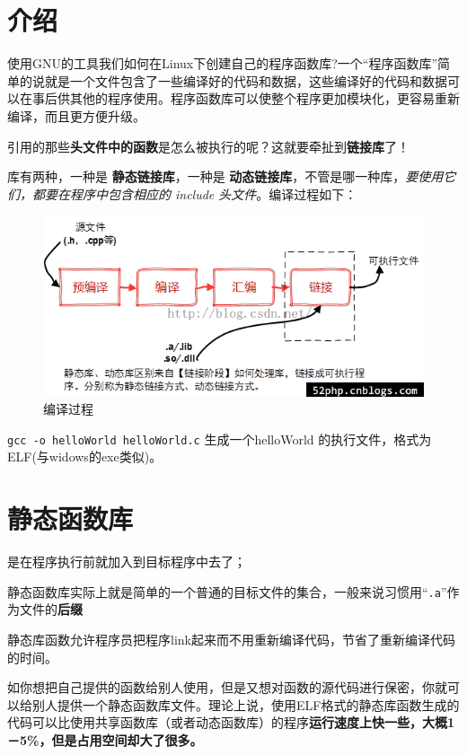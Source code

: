 \documentclass[UTF8,a4paper,12pt]{ctexbook}
\begin{document}
	\section{介绍}
		使用GNU的工具我们如何在Linux下创建自己的程序函数库?一个“程序函数库”简单的说就是一个文件包含了一些编译好的代码和数据，这些编译好的代码和数据可以在事后供其他的程序使用。程序函数库可以使整个程序更加模块化，更容易重新编译，而且更方便升级。  
		
		引用的那些\textbf{头文件中的函数}是怎么被执行的呢？这就要牵扯到\textbf{链接库}了！
		
		库有两种，一种是 \textbf{静态链接库}，一种是 \textbf{动态链接库}，不管是哪一种库，\textit{要使用它们，都要在程序中包含相应的 include 头文件}。编译过程如下：
		
		\begin{figure}[H]
			\centering
			\includegraphics[scale = 0.7]{figure/compileProcess.png}
			\caption{编译过程}
		\end{figure}
		
		\verb|gcc -o helloWorld helloWorld.c| 生成一个helloWorld 的执行文件，格式为ELF(与widows的exe类似)。
		
	\section{静态函数库}是在程序执行前就加入到目标程序中去了；
	
		静态函数库实际上就是简单的一个普通的目标文件的集合，一般来说习惯用“\verb|.a|”作为文件的\textbf{后缀}
		
		静态库函数允许程序员把程序link起来而不用重新编译代码，节省了重新编译代码的时间。
		
		如你想把自己提供的函数给别人使用，但是又想对函数的源代码进行保密，你就可以给别人提供一个静态函数库文件。理论上说，使用ELF格式的静态库函数生成的代码可以比使用共享函数库（或者动态函数库）的程序\textbf{运行速度上快一些，大概1－5\%，但是占用空间却大了很多。}
			
\end{document}
